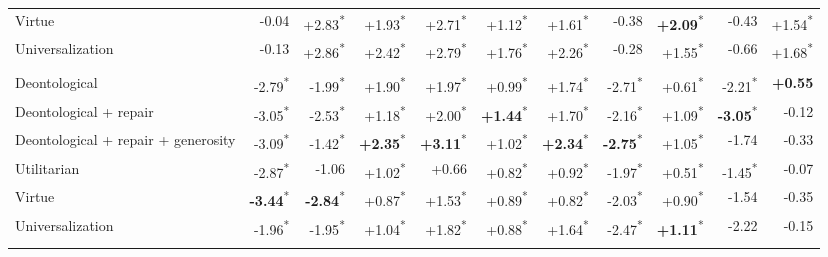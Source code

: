 \begin{table}[t]
\begin{tabular}{lrrrrrrrrrr}
Virtue & -0.04 & +2.83\textsuperscript{*} & +1.93\textsuperscript{*} & +2.71\textsuperscript{*} & +1.12\textsuperscript{*} & +1.61\textsuperscript{*} & -0.38 & \textbf{+2.09}\textsuperscript{*} & -0.43 & +1.54\textsuperscript{*} \\
Universalization & -0.13 & +2.86\textsuperscript{*} & +2.42\textsuperscript{*} & +2.79\textsuperscript{*} & +1.76\textsuperscript{*} & +2.26\textsuperscript{*} & -0.28 & +1.55\textsuperscript{*} & -0.66 & +1.68\textsuperscript{*} \\
\addlinespace
\multicolumn{11}{l}{\emph{Stag Hunt}} \\
Deontological & -2.79\textsuperscript{*} & -1.99\textsuperscript{*} & +1.90\textsuperscript{*} & +1.97\textsuperscript{*} & +0.99\textsuperscript{*} & +1.74\textsuperscript{*} & -2.71\textsuperscript{*} & +0.61\textsuperscript{*} & -2.21\textsuperscript{*} & \textbf{+0.55} \\
Deontological + repair & -3.05\textsuperscript{*} & -2.53\textsuperscript{*} & +1.18\textsuperscript{*} & +2.00\textsuperscript{*} & \textbf{+1.44}\textsuperscript{*} & +1.70\textsuperscript{*} & -2.16\textsuperscript{*} & +1.09\textsuperscript{*} & \textbf{-3.05}\textsuperscript{*} & -0.12 \\
Deontological + repair + generosity & -3.09\textsuperscript{*} & -1.42\textsuperscript{*} & \textbf{+2.35}\textsuperscript{*} & \textbf{+3.11}\textsuperscript{*} & +1.02\textsuperscript{*} & \textbf{+2.34}\textsuperscript{*} & \textbf{-2.75}\textsuperscript{*} & +1.05\textsuperscript{*} & -1.74 & -0.33 \\
Utilitarian & -2.87\textsuperscript{*} & -1.06 & +1.02\textsuperscript{*} & +0.66 & +0.82\textsuperscript{*} & +0.92\textsuperscript{*} & -1.97\textsuperscript{*} & +0.51\textsuperscript{*} & -1.45\textsuperscript{*} & -0.07 \\
Virtue & \textbf{-3.44}\textsuperscript{*} & \textbf{-2.84}\textsuperscript{*} & +0.87\textsuperscript{*} & +1.53\textsuperscript{*} & +0.89\textsuperscript{*} & +0.82\textsuperscript{*} & -2.03\textsuperscript{*} & +0.90\textsuperscript{*} & -1.54 & -0.35 \\
Universalization & -1.96\textsuperscript{*} & -1.95\textsuperscript{*} & +1.04\textsuperscript{*} & +1.82\textsuperscript{*} & +0.88\textsuperscript{*} & +1.64\textsuperscript{*} & -2.47\textsuperscript{*} & \textbf{+1.11}\textsuperscript{*} & -2.22 & -0.15 \\
\addlinespace
\multicolumn{11}{l}{\emph{Chicken}} \\

\end{tabular}
\end{table}
